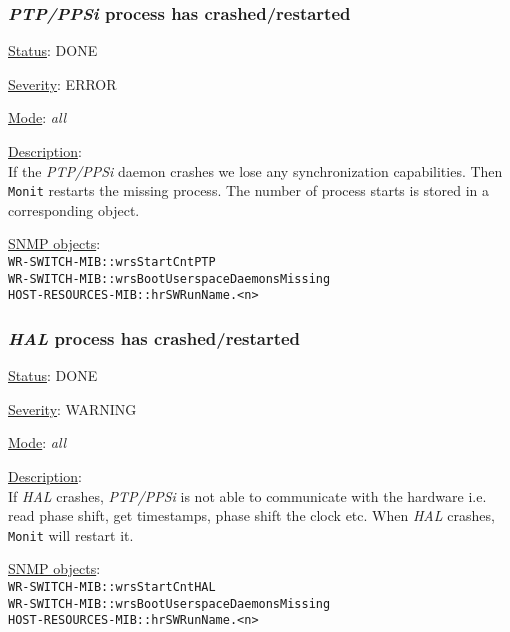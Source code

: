 \subsubsection{\bf \emph{PTP/PPSi} process has crashed/restarted}
		\label{fail:timing:ppsi_crash}
		\begin{packed_enum}
			\item [] \underline{Status}: DONE
			\item [] \underline{Severity}: ERROR
			\item [] \underline{Mode}: \emph{all}
			\item [] \underline{Description}:\\
				If the \emph{PTP/PPSi} daemon crashes we lose any synchronization
				capabilities. Then \texttt{Monit} restarts the missing process.
				The number of process starts is stored in a corresponding object.
			\item [] \underline{SNMP objects}:\\
				\texttt{WR-SWITCH-MIB::wrsStartCntPTP}\\
				\texttt{WR-SWITCH-MIB::wrsBootUserspaceDaemonsMissing}\\
				\texttt{HOST-RESOURCES-MIB::hrSWRunName.<n>}
		\end{packed_enum}

\subsubsection{\bf \emph{HAL} process has crashed/restarted}
		\label{fail:timing:hal_crash}
		\begin{packed_enum}
			\item [] \underline{Status}: DONE
			\item [] \underline{Severity}: WARNING
			\item [] \underline{Mode}: \emph{all}
			\item [] \underline{Description}:\\
				If \emph{HAL} crashes, \emph{PTP/PPSi} is not able to communicate with
				the hardware i.e. read phase shift, get timestamps, phase shift the
				clock etc. When \emph{HAL} crashes, \texttt{Monit} will restart it.
			\item [] \underline{SNMP objects}:\\
				\texttt{WR-SWITCH-MIB::wrsStartCntHAL}\\
				\texttt{WR-SWITCH-MIB::wrsBootUserspaceDaemonsMissing}\\
				\texttt{HOST-RESOURCES-MIB::hrSWRunName.<n>}
		\end{packed_enum}

